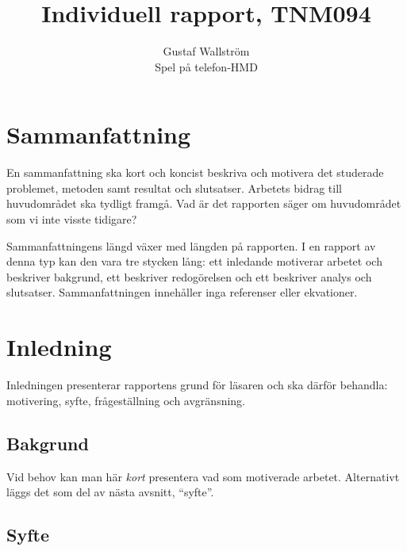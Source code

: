 \documentclass[a4paper,12pt,oneside,final]{extbook}
\title{Individuell rapport, TNM094}
\author{Gustaf Wallström\\Spel på telefon-HMD}
\begin{document}
\pagestyle{empty}
\thispagestyle{empty}

\frontmatter

\maketitle

\pagestyle{fancy}

\chapter{Sammanfattning}

En sammanfattning ska kort och koncist beskriva och motivera det
studerade problemet, metoden samt resultat och slutsatser. Arbetets
bidrag till huvudområdet ska tydligt framgå. Vad är det rapporten
säger om huvudområdet som vi inte visste tidigare?

Sammanfattningens längd växer med längden på rapporten. I en rapport
av denna typ kan den vara tre stycken lång: ett inledande motiverar
arbetet och beskriver bakgrund, ett beskriver redogörelsen och ett
beskriver analys och slutsatser. Sammanfattningen innehåller inga
referenser eller ekvationer.


\tableofcontents

\cleardoublepage
{}
\listoffigures

\cleardoublepage
{}
\listoftables

\mainmatter

\chapter{Inledning}
\label{ch:inledning}

Inledningen presenterar rapportens grund för läsaren och ska därför
behandla: motivering, syfte, frågeställning och avgränsning.


\section{Bakgrund}

Vid behov kan man här \emph{kort} presentera vad som motiverade
arbetet. Alternativt läggs det som del av nästa avsnitt, ``syfte''.


\section{Syfte}
\end{document}
